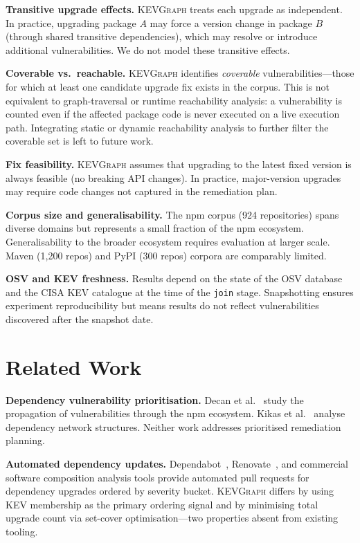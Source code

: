 \documentclass[conference]{IEEEtran}
\newcommand{\kevgraph}{\textsc{KEVGraph}\xspace}
\begin{document}
\textbf{Transitive upgrade effects.}  \kevgraph treats each upgrade as
independent.  In practice, upgrading package $A$ may force a version
change in package $B$ (through shared transitive dependencies), which
may resolve or introduce additional vulnerabilities.  We do not model
these transitive effects.

\textbf{Coverable vs.\ reachable.}  \kevgraph identifies
\emph{coverable} vulnerabilities---those for which at least one
candidate upgrade fix exists in the corpus.  This is not equivalent
to graph-traversal or runtime reachability analysis: a vulnerability
is counted even if the affected package code is never executed on a
live execution path.  Integrating static or dynamic reachability
analysis to further filter the coverable set is left to future work.

\textbf{Fix feasibility.}  \kevgraph assumes that upgrading to the
latest fixed version is always feasible (no breaking API changes).  In
practice, major-version upgrades may require code changes not captured
in the remediation plan.

\textbf{Corpus size and generalisability.}  The npm corpus (924
repositories) spans diverse domains but represents a small fraction of
the npm ecosystem.  Generalisability to the broader ecosystem requires
evaluation at larger scale.  Maven (1,200 repos) and PyPI (300 repos)
corpora are comparably limited.

\textbf{OSV and KEV freshness.}  Results depend on the state of the
OSV database and the CISA KEV catalogue at the time of the \texttt{join}
stage.  Snapshotting ensures experiment reproducibility but means
results do not reflect vulnerabilities discovered after the snapshot date.

\section{Related Work}
\label{sec:related}

\textbf{Dependency vulnerability prioritisation.}
Decan et al.~\cite{decan19} study the propagation of vulnerabilities
through the npm ecosystem.  Kikas et al.~\cite{kikas17} analyse
dependency network structures.  Neither work addresses prioritised
remediation planning.

\textbf{Automated dependency updates.}
Dependabot~\cite{dependabot}, Renovate~\cite{renovate}, and commercial
software composition analysis tools provide automated pull requests for
dependency upgrades ordered by severity bucket.  \kevgraph differs by
using KEV membership as the primary ordering signal and by minimising
total upgrade count via set-cover optimisation---two properties absent
from existing tooling.
\end{document}
